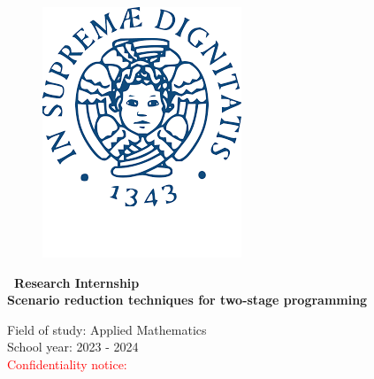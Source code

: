 \documentclass{amsart}
\begin{document}
\begin{figure}[htbp]
\begin{minipage}[b]{0.25\textwidth}
        \includegraphics[width=\textwidth]{logo/universita di pisa.png}
    \end{minipage}
\end{figure}

\vspace{1.5cm}	

\begin{center}	
    {\huge \bf\ Research Internship  \\
    \vspace{1cm}
    \huge Scenario reduction techniques for two-stage programming \\
    \vspace{1.5cm}

    \normalsize Field of study: Applied Mathematics \\
    School year: 2023 - 2024 \\



    \vspace{3.75cm}
    \textcolor{red}{Confidentiality notice:}\\
    \color{black}
    \vspace{0.75cm}
    }
\end{center}
\end{document}
